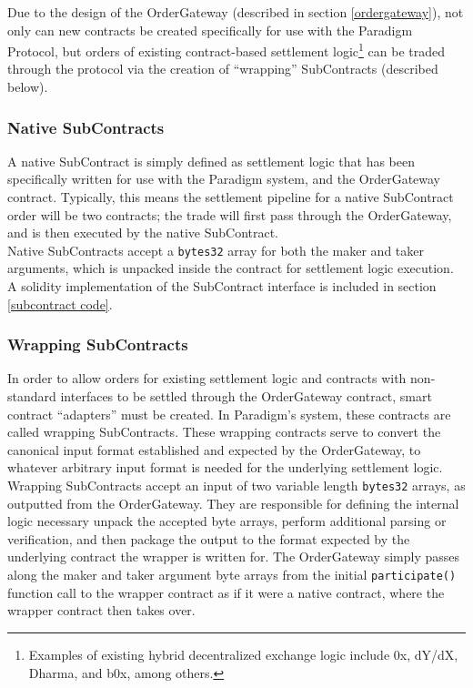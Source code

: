 \documentclass[9pt]{article}
\begin{document}
\noindent Due to the design of the OrderGateway (described in section \ref{ordergateway}), not only can new contracts be created specifically for use with the Paradigm Protocol, but orders of existing contract-based settlement logic\footnote{Examples of existing hybrid decentralized exchange logic include 0x, dY/dX, Dharma, and b0x, among others.} can be traded through the protocol via the creation of “wrapping” SubContracts (described below).

\subsubsection{Native SubContracts}
\noindent A native SubContract is simply defined as settlement logic that has been specifically written for use with the Paradigm system, and the OrderGateway contract. Typically, this means the settlement pipeline for a native SubContract order will be two contracts; the trade will first pass through the OrderGateway, and is then executed by the native SubContract. \\

\noindent Native SubContracts accept a \texttt{bytes32} array for both the maker and taker arguments, which is unpacked inside the contract for settlement logic execution. A solidity implementation of the SubContract interface is included in section \ref{subcontract code}.

\subsubsection{Wrapping SubContracts}
\noindent In order to allow orders for existing settlement logic and contracts with non-standard interfaces to be settled through the OrderGateway contract, smart contract “adapters” must be created. In Paradigm’s system, these contracts are called wrapping SubContracts. These wrapping contracts serve to convert the canonical input format established and expected by the OrderGateway, to whatever arbitrary input format is needed for the underlying settlement logic. \\

\noindent Wrapping SubContracts accept an input of two variable length \texttt{bytes32} arrays, as outputted from the OrderGateway. They are responsible for defining the internal logic necessary unpack the accepted byte arrays, perform additional parsing or verification, and then package the output to the format expected by the underlying contract the wrapper is written for. The OrderGateway simply passes along the maker and taker argument byte arrays from the initial \texttt{participate()} function call to the wrapper contract as if it were a native contract, where the wrapper contract then takes over. \\
\end{document}
